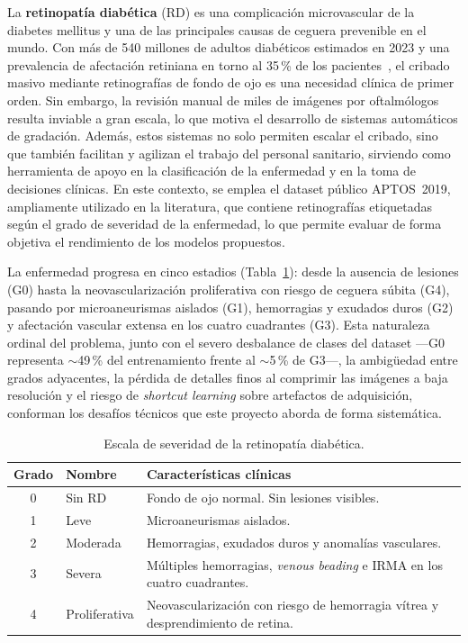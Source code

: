 \documentclass[12pt, a4paper]{article}
\begin{document}
La \textbf{retinopatía diabética} (RD) es una complicación microvascular de la
diabetes mellitus y una de las principales causas de ceguera prevenible en el mundo.
Con más de 540 millones de adultos diabéticos estimados en 2023 y una prevalencia
de afectación retiniana en torno al 35\,\% de los pacientes~\cite{idf2023,who2023},
el cribado masivo mediante retinografías de fondo de ojo es una necesidad clínica
de primer orden. Sin embargo, la revisión manual de miles de imágenes por
oftalmólogos resulta inviable a gran escala, lo que motiva el desarrollo de sistemas
automáticos de gradación. Además, estos sistemas no solo permiten escalar el
cribado, sino que también facilitan y agilizan el trabajo del personal sanitario,
sirviendo como herramienta de apoyo en la clasificación de la enfermedad y en la
toma de decisiones clínicas. En este contexto, se emplea el dataset público APTOS~2019, ampliamente utilizado en la literatura, que contiene retinografías etiquetadas según el grado de severidad de la enfermedad, lo que permite evaluar de forma objetiva el rendimiento de los modelos propuestos.

La enfermedad progresa en cinco estadios (Tabla~\ref{tab:grados}): desde la ausencia
de lesiones (G0) hasta la neovascularización proliferativa con riesgo de ceguera súbita
(G4), pasando por microaneurismas aislados (G1), hemorragias y exudados duros (G2) y
afectación vascular extensa en los cuatro cuadrantes (G3). Esta naturaleza ordinal del
problema, junto con el severo desbalance de clases del dataset ---G0 representa
$\sim$49\,\% del entrenamiento frente al $\sim$5\,\% de G3---, la ambigüedad entre
grados adyacentes, la pérdida de detalles finos al comprimir las imágenes a baja
resolución y el riesgo de \textit{shortcut learning} sobre artefactos de adquisición,
conforman los desafíos técnicos que este proyecto aborda de forma sistemática.

\begin{table}[H]
  \centering
  \caption{Escala de severidad de la retinopatía diabética.}
  \label{tab:grados}
  \begin{tabularx}{0.9\textwidth}{c l X}
    \toprule
    \rowcolor{azuloscuro!15}
    \textbf{Grado} & \textbf{Nombre} & \textbf{Características clínicas} \\
    \midrule
    0 & Sin RD        & Fondo de ojo normal. Sin lesiones visibles. \\
    \rowcolor{grisclaro}
    1 & Leve          & Microaneurismas aislados. \\
    2 & Moderada      & Hemorragias, exudados duros y anomalías vasculares. \\
    \rowcolor{grisclaro}
    3 & Severa        & Múltiples hemorragias, \textit{venous beading} e IRMA
                        en los cuatro cuadrantes. \\
    4 & Proliferativa & Neovascularización con riesgo de hemorragia vítrea
                        y desprendimiento de retina. \\
    \bottomrule
  \end{tabularx}
\end{table}
\end{document}
